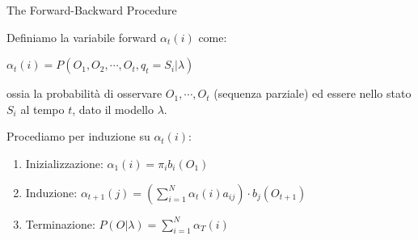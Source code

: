 \documentclass[slidestop,mathserif,red]{beamer}
\begin{document}
\begin{frame}{The Forward-Backward Procedure}
 \begin{block}{}
  Definiamo la variabile forward $\alpha_{t}(i)$ come:
	\begin{center}
	$\alpha_{t}(i) = P(O_{1}, O_{2}, \cdots, O_{t}, q_{t} = S_{i}|\lambda)$
	\end{center}
ossia la probabilit\`a di osservare $O_{1}, \cdots, O_{t}$ (sequenza parziale) ed essere nello stato $S_{i}$ al tempo $t$, dato il modello $\lambda$.
 \end{block}
 \begin{block}{}
	Procediamo per induzione su $\alpha_{t}(i)$:
	\begin{enumerate}
 	\item Inizializzazione: $\alpha_{1}(i) = \pi_{i}b_{i}(O_{1})$
	\item Induzione: $\alpha_{t+1}(j) = (\sum_{i = 1}^{N} \alpha_{t}(i)a_{ij}) \cdot b_{j}(O_{t+1})$
	\item Terminazione: $P(O|\lambda) = \sum_{i=1}^{N}\alpha_{T}(i)$
	\end{enumerate}
 \end{block}

\end{frame}
\end{document}
